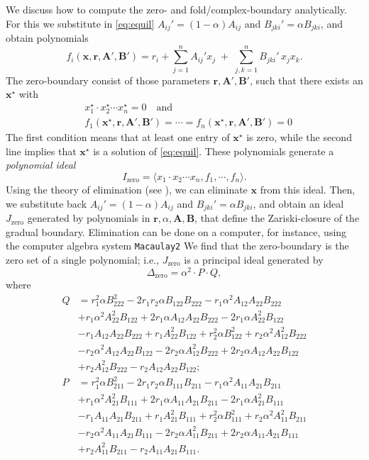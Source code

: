\documentclass[pdflatex,sn-mathphys-num]{sn-jnl}%
\begin{document}
We discuss how to compute the zero- and fold/complex-boundary analytically. For this we substitute in \eqref{eq:equil} $ A_{ij}' = (1-\alpha) A_{ij}$ and $B_{jki}'=\alpha B_{jki}$, and obtain polynomials
$$f_i(\mathbf x, \mathbf r, \mathbf A', \mathbf B') = r_i +\sum_{j=1}^n A_{ij}'x_j
\;+\;\sum_{j,k=1}^n B_{jki}'\,x_j x_k.$$
The zero-boundary consist of those parameters $\mathbf r, \mathbf A', \mathbf B'$, such that there exists an $\mathbf x^\star$ with 
\begin{align*}
 &x_1^\star \cdot x_2^\star \cdots x_n^\star =0\quad \text{and} \\
 &f_1(\mathbf x^\star , \mathbf r, \mathbf A', \mathbf B') = \cdots = f_n(\mathbf x^\star , \mathbf r, \mathbf A', \mathbf B') = 0
\end{align*} 
The first condition means that at least one entry of $\mathbf x^\star$ is zero, while the second line implies that $\mathbf x^\star$ is a solution of \eqref{eq:equil}.
These polynomials generate a \emph{polynomial ideal} \cite{cox_ideals_2018}
$$I_\text{zero} = \langle x_1 \cdot x_2 \cdots x_n, f_1,\cdots,f_n\rangle.$$
Using the theory of elimination (see \cite[Chapter 3]{cox_ideals_2018}), we can eliminate $\mathbf x$ from this ideal. Then, we substitute back $ A_{ij}' = (1-\alpha) A_{ij}$ and $B_{jki}'=\alpha B_{jki}$, and obtain an ideal $J_\text{zero}$ generated by polynomials in $\mathbf r, \alpha, \mathbf A, \mathbf B$, that define the Zariski-closure of the gradual boundary. Elimination can be done on a computer, for instance, using the computer algebra system \texttt{Macaulay2} %
We find that the zero-boundary is the zero set of a single polynomial; i.e., $J_\text{zero}$ is a principal ideal generated by 
$$\Delta_\text{zero} = \alpha^2 \cdot P\cdot Q,$$
where 
{\small
\begin{align*}
Q& = r_{1}^{2}\alpha B_{222}^{2}-2 r_{1} r_{2} \alpha B_{122} B_{222}-r_{1} \alpha^{2}A_{12} A_{22} B_{222}\\
&+r_{1} \alpha^{2}A_{22}^{2}B_{122}+2 r_{1} \alpha A_{12} A_{22} B_{222}-2 r_{1} \alpha A_{22}^{2}B_{122}\\
&-r_{1} A_{12} A_{22} B_{222}+r_{1} A_{22}^{2}B_{122}+r_{2}^{2}\alpha B_{122}^{2}+r_{2} \alpha^{2}A_{12}^{2}B_{222}\\
&-r_{2} \alpha^{2}A_{12} A_{22} B_{122}-2 r_{2} \alpha A_{12}^{2}B_{222}+2 r_{2} \alpha A_{12} A_{22} B_{122}\\
&+r_{2} A_{12}^{2}B_{222}-r_{2} A_{12} A_{22} B_{122};\\
P&=r_{1}^{2}\alpha B_{211}^{2}-2 r_{1} r_{2} \alpha B_{111} B_{211}-r_{1} \alpha^{2}A_{11} A_{21} B_{211}\\
&+r_{1} \alpha^{2}A_{21}^{2}B_{111}+2 r_{1} \alpha A_{11} A_{21} B_{211}-2 r_{1} \alpha A_{21}^{2}B_{111}\\
&-r_{1} A_{11} A_{21} B_{211}+r_{1} A_{21}^{2}B_{111}+r_{2}^{2}\alpha B_{111}^{2}+r_{2} \alpha^{2}A_{11}^{2}B_{211}\\
&-r_{2} \alpha^{2}A_{11} A_{21} B_{111}-2 r_{2} \alpha A_{11}^{2}B_{211}+2 r_{2} \alpha A_{11} A_{21} B_{111}\\
&+r_{2} A_{11}^{2}B_{211}-r_{2} A_{11} A_{21} B_{111}.
\end{align*}}
\end{document}
